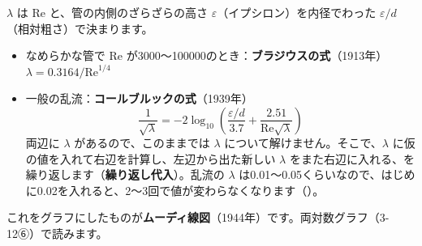 \begin{phflow}[損失のある流れ]
\end{phflow}

$\lambda$ は Re と、管の内側のざらざらの高さ $\varepsilon$（イプシロン）を内径でわった $\varepsilon/d$（相対粗さ）で決まります。

\begin{itemize}[leftmargin=1.2\zw, itemsep=1pt, topsep=1pt, label={\color{bkTheme}●}]
\item なめらかな管で Re が3000〜\num{100000}のとき：\textbf{ブラジウスの式}（1913年）$\lambda=\allowbreak0.3164/\mathrm{Re}^{1/4}$
\item 一般の乱流：\textbf{コールブルックの式}（1939年）
\[\frac{1}{\sqrt\lambda}=-2\log_{10}\left(\frac{\varepsilon/d}{3.7}+\frac{2.51}{\mathrm{Re}\sqrt\lambda}\right)\]
両辺に $\lambda$ があるので、このままでは $\lambda$ について解けません。そこで、$\lambda$ に仮の値を入れて右辺を計算し、左辺から出た新しい $\lambda$ をまた右辺に入れる、を繰り返します（\textbf{繰り返し代入}）。乱流の $\lambda$ は0.01〜0.05くらいなので、はじめに0.02を入れると、2〜3回で値が変わらなくなります（\nobreak{}\nobreak）。
\end{itemize}
これをグラフにしたものが\textbf{ムーディ線図}（1944年）です。両対数グラフ（3-12⑥）で読みます。

